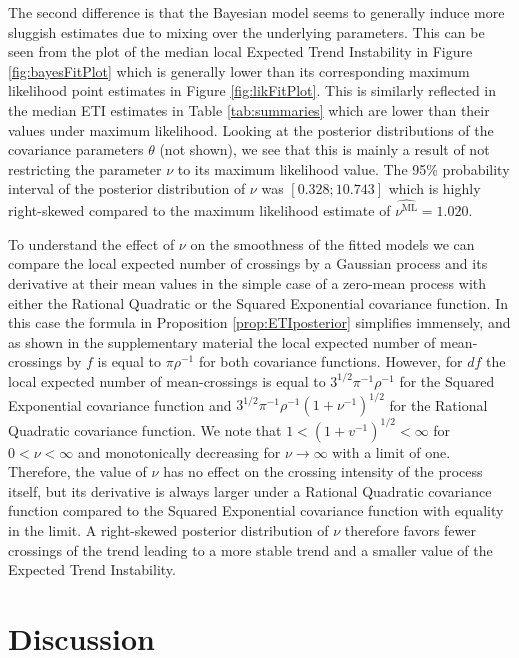\documentclass[11pt,]{article}
\theoremstyle{nonumberplain}
\begin{document}
The second difference is that the Bayesian model seems to generally
induce more sluggish estimates due to mixing over the underlying
parameters. This can be seen from the plot of the median local Expected
Trend Instability in Figure \ref{fig:bayesFitPlot} which is generally
lower than its corresponding maximum likelihood point estimates in
Figure \ref{fig:likFitPlot}. This is similarly reflected in the median
ETI estimates in Table \ref{tab:summaries} which are lower than their
values under maximum likelihood. Looking at the posterior distributions
of the covariance parameters \(\theta\) (not shown), we see that this is
mainly a result of not restricting the parameter \(\nu\) to its maximum
likelihood value. The 95\% probability interval of the posterior
distribution of \(\nu\) was \([0.328; 10.743]\) which is highly
right-skewed compared to the maximum likelihood estimate of
\(\widehat{\nu^\text{ML}} = 1.020\).

To understand the effect of \(\nu\) on the smoothness of the fitted
models we can compare the local expected number of crossings by a
Gaussian process and its derivative at their mean values in the simple
case of a zero-mean process with either the Rational Quadratic or the
Squared Exponential covariance function. In this case the formula in
Proposition \ref{prop:ETIposterior} simplifies immensely, and as shown
in the supplementary material the local expected number of
mean-crossings by \(f\) is equal to \(\pi\rho^{-1}\) for both covariance
functions. However, for \(df\) the local expected number of
mean-crossings is equal to \(3^{1/2}\pi^{-1}\rho^{-1}\) for the Squared
Exponential covariance function and
\(3^{1/2}\pi^{-1}\rho^{-1}(1 + \nu^{-1})^{1/2}\) for the Rational
Quadratic covariance function. We note that
\(1 < (1 + v^{-1})^{1/2} < \infty\) for \(0 < \nu < \infty\) and
monotonically decreasing for \(\nu \rightarrow \infty\) with a limit of
one. Therefore, the value of \(\nu\) has no effect on the crossing
intensity of the process itself, but its derivative is always larger
under a Rational Quadratic covariance function compared to the Squared
Exponential covariance function with equality in the limit. A
right-skewed posterior distribution of \(\nu\) therefore favors fewer
crossings of the trend leading to a more stable trend and a smaller
value of the Expected Trend Instability.

\section{Discussion}\label{sec:discussion}
\end{document}
